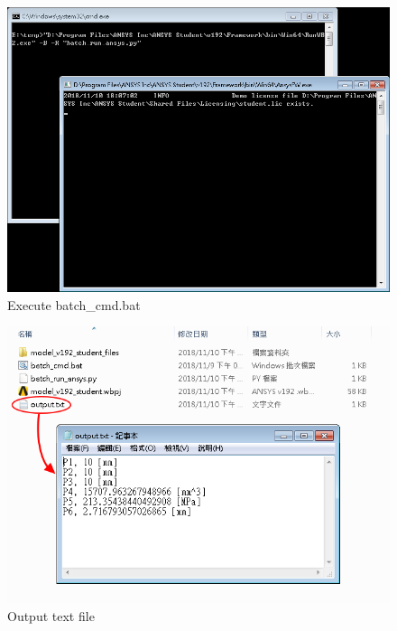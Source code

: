 \documentclass[12pt]{kjleehw}
\begin{document}
\begin{CJK}{UTF8}{bkai}
\begin{figure}[h]
	\centering
	\includegraphics[scale=0.5]{figure/batch.png}
	\caption{Execute batch\_cmd.bat}
	\label{fig:batch}
\end{figure}

\begin{figure}[h]
	\centering
	\includegraphics[scale=0.6]{figure/output.png}
	\caption{Output text file}
	\label{fig:output}
\end{figure}

\newpage

\clearpage
\end{CJK}
\end{document}
